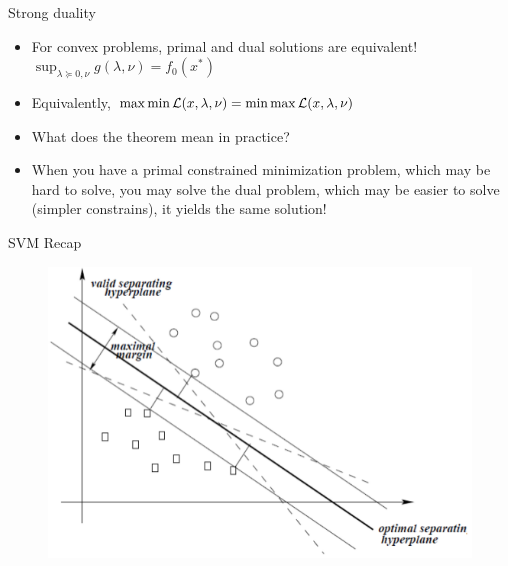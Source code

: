 \documentclass[notes]{beamer}
\begin{document}
\begin{frame}
	{Strong duality}
	\begin{itemize}
		\item For convex problems, primal and dual solutions are equivalent! $\sup_{\lambda \succeq 0, \nu } g(\lambda,\nu) =f_0(x^*) $
		\item Equivalently, $\max \min \mathcal{L} (x , \lambda, \nu) =\min \max \mathcal{L} (x, \lambda, \nu) $
		\item What does the theorem mean in practice?

		\item When you have a primal constrained minimization problem, which may be hard to solve, you may solve the dual problem, which may be easier to solve (simpler constrains), it yields the same solution!

	\end{itemize}
\end{frame}

\begin{frame}
	{SVM Recap}
	\begin{figure}
		\includegraphics[width=.75\textwidth]{2018-03-05-10-14-45.png}
	\end{figure}

\end{frame}
\end{document}
